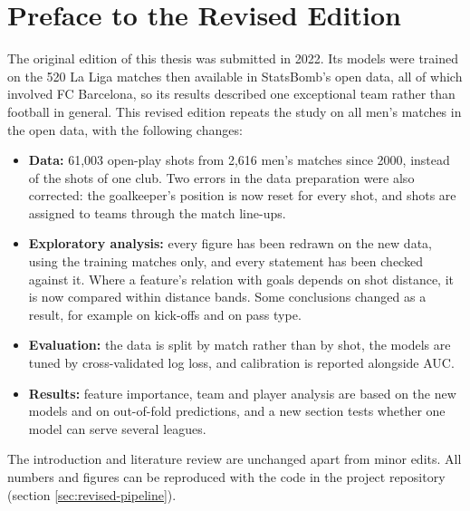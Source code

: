 \documentclass[12pt, a4paper]{report}
\begin{document}
\chapter*{Preface to the Revised Edition}
The original edition of this thesis was submitted in 2022. Its models were trained on the 520 La Liga matches then available in StatsBomb's open data, all of which involved FC Barcelona, so its results described one exceptional team rather than football in general. This revised edition repeats the study on all men's matches in the open data, with the following changes:
\begin{itemize}
    \item \textbf{Data:} 61,003 open-play shots from 2,616 men's matches since 2000, instead of the shots of one club. Two errors in the data preparation were also corrected: the goalkeeper's position is now reset for every shot, and shots are assigned to teams through the match line-ups.
    \item \textbf{Exploratory analysis:} every figure has been redrawn on the new data, using the training matches only, and every statement has been checked against it. Where a feature's relation with goals depends on shot distance, it is now compared within distance bands. Some conclusions changed as a result, for example on kick-offs and on pass type.
    \item \textbf{Evaluation:} the data is split by match rather than by shot, the models are tuned by cross-validated log loss, and calibration is reported alongside AUC.
    \item \textbf{Results:} feature importance, team and player analysis are based on the new models and on out-of-fold predictions, and a new section tests whether one model can serve several leagues.
\end{itemize}
The introduction and literature review are unchanged apart from minor edits. All numbers and figures can be reproduced with the code in the project repository (section \ref{sec:revised-pipeline}).










%
%
%
\printbibliography
\end{document}
